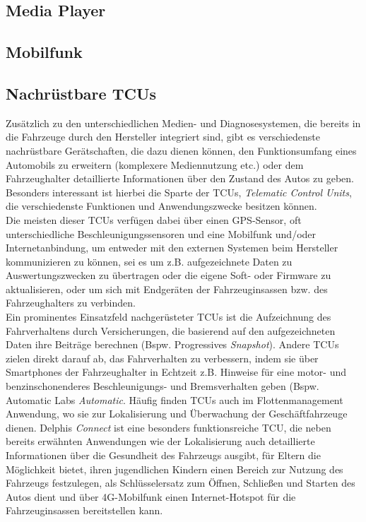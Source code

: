 \documentclass[
    fontsize=12pt,
    headings=small,
    parskip=half,           %
    bibliography=totoc,9
    numbers=noenddot,       %
    open=any,               %
    ]{scrreprt}
\begin{document}
\subsection{Media Player}

\subsection{Mobilfunk}

\subsection{Nachrüstbare TCUs}
Zusätzlich zu den unterschiedlichen Medien- und Diagnosesystemen, die bereits in die Fahrzeuge durch den Hersteller integriert sind, gibt es verschiedenste nachrüstbare Gerätschaften, die dazu dienen können, den Funktionsumfang eines Automobils zu erweitern (komplexere Mediennutzung etc.) oder dem Fahrzeughalter detaillierte Informationen über den Zustand des Autos zu geben. Besonders interessant ist hierbei die Sparte der TCUs, \textit{Telematic Control Units}, die verschiedenste Funktionen und Anwendungszwecke besitzen können. \\
Die meisten dieser TCUs verfügen dabei über einen GPS-Sensor, oft unterschiedliche Beschleunigungssensoren und eine Mobilfunk und/oder Internetanbindung, um entweder mit den externen Systemen beim Hersteller kommunizieren zu können, sei es um z.B. aufgezeichnete Daten zu Auswertungszwecken zu übertragen oder die eigene Soft- oder Firmware zu aktualisieren, oder um sich mit Endgeräten der Fahrzeuginsassen bzw. des Fahrzeughalters zu verbinden. \\
Ein prominentes Einsatzfeld nachgerüsteter TCUs ist die Aufzeichnung des Fahrverhaltens durch Versicherungen, die basierend auf den aufgezeichneten Daten ihre Beiträge berechnen (Bspw. Progressives \textit{Snapshot}). Andere TCUs zielen direkt darauf ab, das Fahrverhalten zu verbessern, indem sie über Smartphones der Fahrzeughalter in Echtzeit z.B. Hinweise für eine motor- und benzinschonenderes Beschleunigungs- und Bremsverhalten geben (Bspw. Automatic Labs \textit{Automatic}.
Häufig finden TCUs auch im Flottenmanagement Anwendung, wo sie zur Lokalisierung und Überwachung der Geschäftfahrzeuge dienen. Delphis \textit{Connect} ist eine besonders funktionsreiche TCU, die neben bereits erwähnten Anwendungen wie der Lokalisierung auch detaillierte Informationen über die Gesundheit des Fahrzeugs ausgibt, für Eltern die Möglichkeit bietet, ihren jugendlichen Kindern einen Bereich zur Nutzung des Fahrzeugs festzulegen, als Schlüsselersatz zum Öffnen, Schließen und Starten des Autos dient und über 4G-Mobilfunk einen Internet-Hotspot für die Fahrzeuginsassen bereitstellen kann. \\
\end{document}

